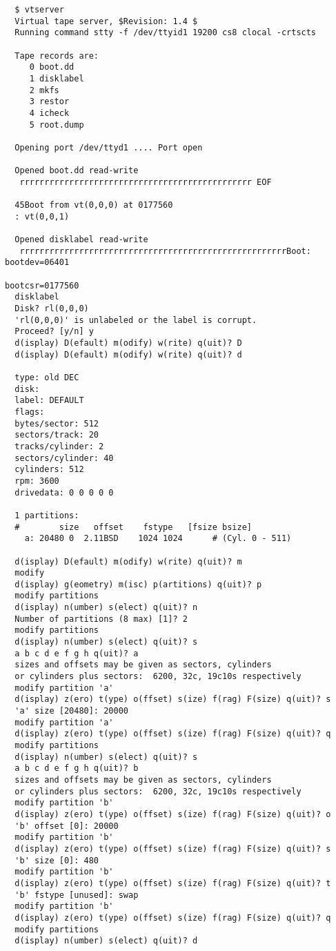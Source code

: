\begin{verbatim}
  $ vtserver 
  Virtual tape server, $Revision: 1.4 $ 
  Running command stty -f /dev/ttyid1 19200 cs8 clocal -crtscts
  
  Tape records are:
     0 boot.dd
     1 disklabel
     2 mkfs
     3 restor
     4 icheck
     5 root.dump
  
  Opening port /dev/ttyd1 .... Port open
  
  Opened boot.dd read-write
   rrrrrrrrrrrrrrrrrrrrrrrrrrrrrrrrrrrrrrrrrrrrrrr EOF
  
  45Boot from vt(0,0,0) at 0177560
  : vt(0,0,1)
  
  Opened disklabel read-write
   rrrrrrrrrrrrrrrrrrrrrrrrrrrrrrrrrrrrrrrrrrrrrrrrrrrrrrBoot: bootdev=06401
                                                               bootcsr=0177560
  disklabel
  Disk? rl(0,0,0)
  'rl(0,0,0)' is unlabeled or the label is corrupt.
  Proceed? [y/n] y
  d(isplay) D(efault) m(odify) w(rite) q(uit)? D
  d(isplay) D(efault) m(odify) w(rite) q(uit)? d
  
  type: old DEC
  disk: 
  label: DEFAULT
  flags:
  bytes/sector: 512
  sectors/track: 20
  tracks/cylinder: 2
  sectors/cylinder: 40
  cylinders: 512
  rpm: 3600
  drivedata: 0 0 0 0 0 
  
  1 partitions:
  #        size   offset    fstype   [fsize bsize]
    a: 20480 0  2.11BSD    1024 1024      # (Cyl. 0 - 511)
  
  d(isplay) D(efault) m(odify) w(rite) q(uit)? m
  modify
  d(isplay) g(eometry) m(isc) p(artitions) q(uit)? p
  modify partitions
  d(isplay) n(umber) s(elect) q(uit)? n
  Number of partitions (8 max) [1]? 2
  modify partitions
  d(isplay) n(umber) s(elect) q(uit)? s
  a b c d e f g h q(uit)? a
  sizes and offsets may be given as sectors, cylinders
  or cylinders plus sectors:  6200, 32c, 19c10s respectively
  modify partition 'a'
  d(isplay) z(ero) t(ype) o(ffset) s(ize) f(rag) F(size) q(uit)? s
  'a' size [20480]: 20000
  modify partition 'a'
  d(isplay) z(ero) t(ype) o(ffset) s(ize) f(rag) F(size) q(uit)? q
  modify partitions
  d(isplay) n(umber) s(elect) q(uit)? s
  a b c d e f g h q(uit)? b
  sizes and offsets may be given as sectors, cylinders
  or cylinders plus sectors:  6200, 32c, 19c10s respectively
  modify partition 'b'
  d(isplay) z(ero) t(ype) o(ffset) s(ize) f(rag) F(size) q(uit)? o
  'b' offset [0]: 20000
  modify partition 'b'
  d(isplay) z(ero) t(ype) o(ffset) s(ize) f(rag) F(size) q(uit)? s
  'b' size [0]: 480
  modify partition 'b'
  d(isplay) z(ero) t(ype) o(ffset) s(ize) f(rag) F(size) q(uit)? t
  'b' fstype [unused]: swap
  modify partition 'b'
  d(isplay) z(ero) t(ype) o(ffset) s(ize) f(rag) F(size) q(uit)? q
  modify partitions
  d(isplay) n(umber) s(elect) q(uit)? d
  

\end{verbatim}
